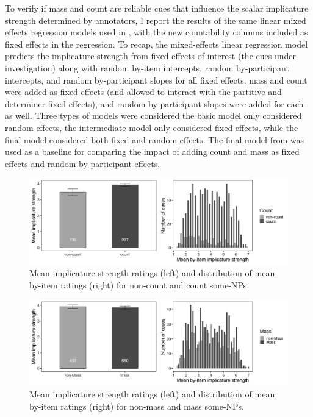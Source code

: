 \documentclass[10pt, biblatex]{report}
\begin{document}
To verify if {\rmsc mass} and {\rmsc count} are reliable cues that influence the
scalar implicature strength determined by annotators, I report the results of
the same linear mixed effects regression models \citep{baayen2008mixed} used in
\citet{degen_investigating_2015}, with the new countability columns included as
fixed effects in the regression. To recap, the mixed-effects linear regression
model predicts the implicature strength from fixed effects of interest (the cues
under investigation) along with random by-item intercepts, random by-participant
intercepts, and random by-participant slopes for all fixed effects. {\rmsc mass}
and {\rmsc count} were added as fixed effects (and allowed to interact with the
{\rmsc partitive} and {\rmsc determiner} fixed effects), and random by-participant
slopes were added for each as well. Three types of models were considered \dash
the basic model only considered random effects, the intermediate model only
considered fixed effects, while the final model considered both fixed and
random effects. The final model from \citet{degen_investigating_2015} was used
as a baseline for comparing the impact of adding {\rmsc count} and {\rmsc mass}
as fixed effects and random by-participant effects.

\begin{figure}[t]
    \centering
    \includegraphics[width=\linewidth]{images/count.png}
    \caption{Mean implicature strength ratings (left) and distribution of mean
             by-item ratings (right) for non-count and count some-NPs.}
    \label{fig:count}
\end{figure}

\begin{figure}[t]
    \centering
    \includegraphics[width=\linewidth]{images/mass.png}
    \caption{Mean implicature strength ratings (left) and distribution of mean
             by-item ratings (right) for non-mass and mass some-NPs.}
    \label{fig:mass}
\end{figure}
\end{document}
